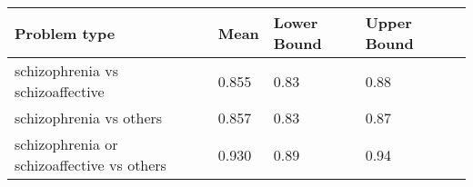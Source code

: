  \sffamily\fontsize{6}{8}\selectfont
\begin{tabular}{|L{.5in}|L{.25in}|L{.25in}|L{.3in}|L{.3in}}\hline
 Problem type & Mean  & Lower Bound & Upper Bound\\\hline
schizophrenia  vs schizoaffective &0.855&0.83&0.88\\\hline
schizophrenia vs others &0.857&0.83&0.87\\\hline
schizophrenia or schizoaffective vs others &0.930&0.89&0.94\\\hline
\end{tabular}
